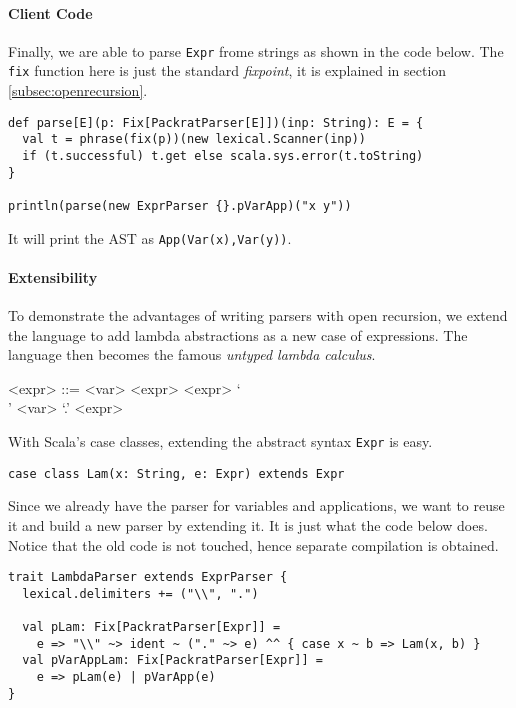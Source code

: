 \paragraph{Client Code}
Finally, we are able to parse \lstinline{Expr} frome strings as shown in the code below. The \lstinline{fix} function here is just the standard \textit{fixpoint}, it is explained in section \ref{subsec:openrecursion}.

\begin{lstlisting}
def parse[E](p: Fix[PackratParser[E]])(inp: String): E = {
  val t = phrase(fix(p))(new lexical.Scanner(inp))
  if (t.successful) t.get else scala.sys.error(t.toString)
}

println(parse(new ExprParser {}.pVarApp)("x y"))
\end{lstlisting}

It will print the AST as \lstinline{App(Var(x),Var(y))}.


\paragraph{Extensibility} To demonstrate the advantages of writing
parsers with open recursion, we extend the language to add lambda
abstractions as a new case of expressions. The language then
becomes the famous \textit{untyped lambda calculus}.

\setlength{\grammarindent}{5em}
\begin{grammar}
<expr> ::= <var>
    \alt <expr> <expr>
    \alt `\\' <var> `.' <expr>
\end{grammar}

With Scala's case classes, extending the abstract syntax \lstinline{Expr} is easy.

\begin{lstlisting}
case class Lam(x: String, e: Expr) extends Expr
\end{lstlisting}

Since we already have the parser for variables and applications, we
want to reuse it and build a new parser by extending it. It is just
what the code below does. Notice that the old code is not touched,
hence separate compilation is obtained.

\begin{lstlisting}
trait LambdaParser extends ExprParser {
  lexical.delimiters += ("\\", ".")

  val pLam: Fix[PackratParser[Expr]] =
    e => "\\" ~> ident ~ ("." ~> e) ^^ { case x ~ b => Lam(x, b) }
  val pVarAppLam: Fix[PackratParser[Expr]] =
    e => pLam(e) | pVarApp(e)
}
\end{lstlisting}

